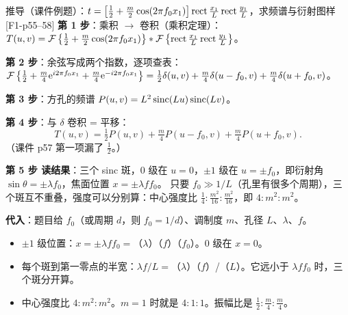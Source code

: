 \begin{exam}{推导（课件例题）：$t=\left[\frac12+\frac m2\cos(2\pi f_0x_1)\right]\operatorname{rect}\frac{x_1}L\operatorname{rect}\frac{y_1}L$，求频谱与衍射图样 [F1-p55–58]}
\textbf{第 1 步}：乘积 $\to$ 卷积（乘积定理）：
$T(u,v)=\mathcal{F}\left\{\tfrac12+\tfrac m2\cos(2\pi f_0x_1)\right\}\ast\mathcal{F}\left\{\operatorname{rect}\tfrac{x_1}L\operatorname{rect}\tfrac{y_1}L\right\}$。

\textbf{第 2 步}：余弦写成两个指数，逐项查表：
$\mathcal{F}\left\{\tfrac12+\tfrac m4\mathrm{e}^{i2\pi f_0x_1}+\tfrac m4\mathrm{e}^{-i2\pi f_0x_1}\right\}=\tfrac12\delta(u,v)+\tfrac m4\delta(u-f_0,v)+\tfrac m4\delta(u+f_0,v)$。

\textbf{第 3 步}：方孔的频谱 $P(u,v)=L^2\operatorname{sinc}(Lu)\operatorname{sinc}(Lv)$。

\textbf{第 4 步}：与 $\delta$ 卷积 = 平移：
\[
T(u,v)=\tfrac12P(u,v)+\tfrac m4P(u-f_0,v)+\tfrac m4P(u+f_0,v).
\]
（课件 p57 第一项漏了 $\frac12$。）

\textbf{第 5 步 读结果}：三个 sinc 斑，0 级在 $u=0$，$\pm1$ 级在 $u=\pm f_0$，即衍射角 $\sin\theta=\pm\lambda f_0$，焦面位置 $x=\pm\lambda ff_0$。
只要 $f_0\gg1/L$（孔里有很多个周期），三个斑互不重叠，强度可以分别算：中心强度比 $\frac14:\frac{m^2}{16}:\frac{m^2}{16}$，即 $4:m^2:m^2$。

\textbf{代入}：题目给 $f_0$（或周期 $d$，则 $f_0=1/d$）、调制度 $m$、孔径 $L$、$\lambda$、$f$。
\begin{itemize}
\item $\pm1$ 级位置：$x=\pm\lambda f f_0=$（$\lambda$）（$f$）（$f_0$）。0 级在 $x=0$。
\item 每个斑到第一零点的半宽：$\lambda f/L=$（$\lambda$）（$f$）/（$L$）。它远小于 $\lambda ff_0$ 时，三个斑分开算。
\item 中心强度比 $4:m^2:m^2$。$m=1$ 时就是 $4:1:1$。振幅比是 $\frac12:\frac m4:\frac m4$。
\end{itemize}
\end{exam}


